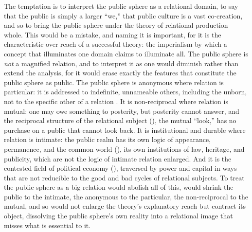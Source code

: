 The temptation is to interpret the public sphere as a relational domain, to say that the public is simply a larger ``we,'' that public culture is a vast co-creation, and so to bring the public sphere under the theory of relational production whole. This would be a mistake, and naming it is important, for it is the characteristic over-reach of a successful theory: the imperialism by which a concept that illuminates one domain claims to illuminate all. The public sphere is \emph{not} a magnified relation, and to interpret it as one would diminish rather than extend the analysis, for it would erase exactly the features that constitute the public sphere as public. The public sphere is anonymous where relation is particular: it is addressed to indefinite, unnameable others, including the unborn, not to the specific other of a relation \parencite{habermas1989}. It is non-reciprocal where relation is mutual: one may owe something to posterity, but posterity cannot answer, and the reciprocal structure of the relational subject (), the mutual ``look,'' has no purchase on a public that cannot look back. It is institutional and durable where relation is intimate: the public realm has its own logic of appearance, permanence, and the common world (\cite{arendt1958}), its own institutions of law, heritage, and publicity, which are not the logic of intimate relation enlarged. And it is the contested field of political economy (), traversed by power and capital in ways that are not reducible to the good and bad cycles of relational subjects. To treat the public sphere as a big relation would abolish all of this, would shrink the public to the intimate, the anonymous to the particular, the non-reciprocal to the mutual, and so would not enlarge the theory's explanatory reach but contract its object, dissolving the public sphere's own reality into a relational image that misses what is essential to it.

